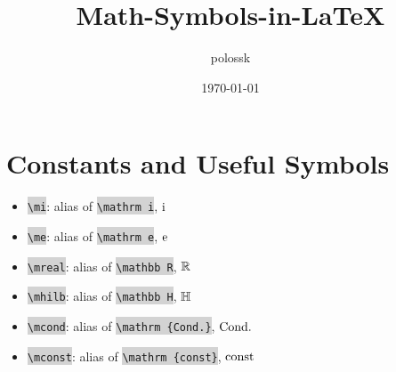 \documentclass{article}
\title{Math-Symbols-in-\LaTeX{}}
\author{polossk}
\date{\today}
\begin{document}
\maketitle
\thispagestyle{fancy}
\renewcommand{\baselinestretch}{1.25}
\sWuhao\fSong

\newcommand\mtex[1]{\colorbox{lightgray}{\color{darkred} {\tt \textbackslash#1}}}
\newcommand\code[1]{\colorbox{lightgray}{\color{darkred} {\tt #1}}}
\section{Constants and Useful Symbols}
\begin{itemize}
\item \mtex{mi}: alias of \mtex{mathrm i}, ${\mathrm i}$
\item \mtex{me}: alias of \mtex{mathrm e}, ${\mathrm e}$
\item \mtex{mreal}: alias of \mtex{mathbb R}, ${\mathbb R}$
\item \mtex{mhilb}: alias of \mtex{mathbb H}, ${\mathbb H}$
\item \mtex{mcond}: alias of \mtex{mathrm \{Cond.\}}, ${\mathrm{Cond.}}$
\item \mtex{mconst}: alias of \mtex{mathrm \{const\}}, ${\mathrm{const}}$
\end{itemize}
\end{document}

